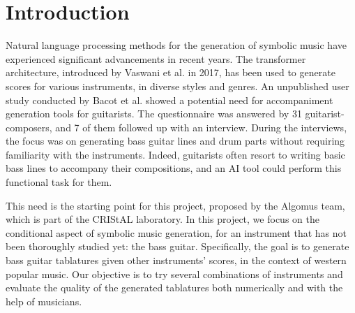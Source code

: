 \documentclass[11pt, a4paper]{article}
\begin{document}






\newpage

\section*{Introduction}

Natural language processing methods for the generation of symbolic music have experienced significant advancements in recent years.
The transformer architecture, introduced by Vaswani et al. in 2017, has been used to generate scores for various instruments, in diverse styles and genres\cite{vaswaniAttentionAllYou2023, leNaturalLanguageProcessing2024}.
An unpublished user study conducted by Bacot et al. showed a potential need for accompaniment generation tools for guitarists.
The questionnaire was answered by 31 guitarist-composers, and 7 of them followed up with an interview.
During the interviews, the focus was on generating bass guitar lines and drum parts without requiring familiarity with the instruments.
Indeed, guitarists often resort to writing basic bass lines to accompany their compositions, and an AI tool could perform this functional task for them\cite{bacot_tablature_2025}.

This need is the starting point for this project, proposed by the Algomus team, which is part of the CRIStAL laboratory.
In this project, we focus on the conditional aspect of symbolic music generation, for an instrument that has not been thoroughly studied yet: the bass guitar.
Specifically, the goal is to generate bass guitar tablatures given other instruments' scores, in the context of western popular music.
Our objective is to try several combinations of instruments and evaluate the quality of the generated tablatures both numerically and with the help of musicians.
\end{document}
